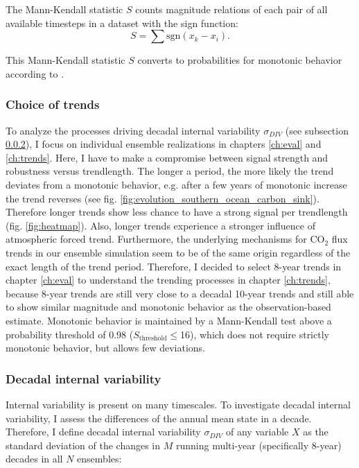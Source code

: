 \documentclass[12pt]{article}
\begin{document}
The Mann-Kendall statistic $S$ counts magnitude relations of each pair of all available timesteps in a dataset with the sign function: 
\[ S= \sum \text{sgn} \left( x_k - x_i \right). \]

This Mann-Kendall statistic $S$ converts to probabilities for monotonic behavior according to \cite{Gilbert1987}.

\subsubsection{Choice of trends} 
\label{sec:choicetrend}
To analyze the processes driving decadal internal variability $\sigma_{DIV}$ (see subsection \ref{sec:DIV}), I focus on individual ensemble realizations in chapters \ref{ch:eval} and \ref{ch:trends}. Here, I have to make a compromise between signal strength and robustness versus trendlength. The longer a period, the more likely the trend deviates from a monotonic behavior, e.g. after a few years of monotonic increase the trend reverses (see fig. \ref{fig:evolution_southern_ocean_carbon_sink}). Therefore longer trends show less chance to have a strong signal per trendlength (fig. \ref{fig:heatmap}). Also, longer trends experience a stronger influence of atmospheric forced trend. Furthermore, the underlying mechanisms for CO$_2$ flux trends in our ensemble simulation seem to be of the same origin regardless of the exact length of the trend period. Therefore, I decided to select 8-year trends in chapter \ref{ch:eval} to understand the trending processes in chapter \ref{ch:trends}, because 8-year trends are still very close to a decadal 10-year trends and still able to show similar magnitude and monotonic behavior as the observation-based estimate. 
Monotonic behavior is maintained by a Mann-Kendall test above a probability threshold of 0.98 ($S_{\text{threshold}} \leq$16), which does not require strictly monotonic behavior, but allows few deviations.

\subsubsection{Decadal internal variability}
\label{sec:DIV}
Internal variability is present on many timescales. To investigate decadal internal variability, I assess the differences of the annual mean state in a decade. Therefore, I define decadal internal variability $\sigma_{DIV}$ of any variable $X$ as the standard deviation of the changes in $M$ running multi-year (specifically 8-year) decades in all $N$ ensembles:
\end{document}
